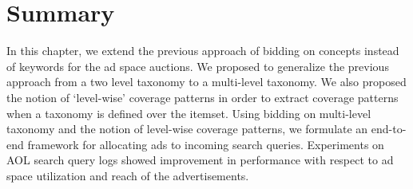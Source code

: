 \section{Summary}

\label{ch5Summary}
In this chapter, we extend the previous approach of bidding on concepts instead of keywords for the ad space auctions. We proposed to generalize the previous approach from a two level taxonomy to a multi-level taxonomy. We also proposed the notion of `level-wise' coverage patterns in order to extract coverage patterns when a taxonomy is defined over the itemset. Using bidding on multi-level taxonomy and the notion of level-wise coverage patterns, we formulate an end-to-end framework for allocating ads to incoming search queries. Experiments on AOL search query logs showed improvement in performance with respect to ad space utilization and reach of the advertisements.